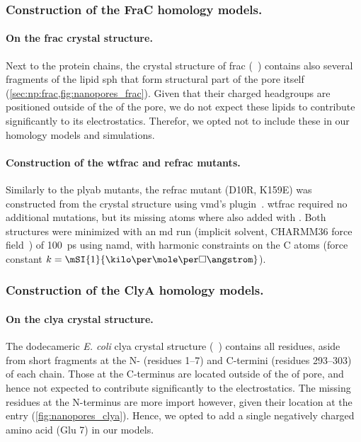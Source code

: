\subsubsection{Construction of the FraC homology models.}
%

\paragraph{On the \gls{frac} crystal structure.}
%
Next to the protein chains, the crystal structure of \gls{frac} (~\cite{Tanaka-2015}) contains
also several fragments of the lipid \gls{sph} that form structural part of the pore itself
(\cref{sec:np:frac,fig:nanopores_frac}). Given that their charged headgroups are positioned outside of the
\lumen{} of the pore, we do not expect these lipids to contribute significantly to its electrostatics.
Therefor, we opted not to include these in our homology models and simulations.

\paragraph{Construction of the \gls{wtfrac} and \gls{refrac} mutants.}
%
Similarly to the \gls{plyab} mutants, the \gls{refrac} mutant (D10R, K159E) was constructed from the crystal
structure using \gls{vmd}'s  plugin~\cite{Humphrey-1996}. \Gls{wtfrac} required no additional
mutations, but its missing atoms where also added with . Both structures were minimized with an
\gls{md} run (implicit solvent, CHARMM36 force field~\cite{Best-2012}) of \SI{100}{\ps} using \gls{namd}, with
harmonic constraints on the C\ta{} atoms (force constant $k =
\mSI{1}{\kilo\cal\per\mole\per\square\angstrom}$).


\subsubsection{Construction of the ClyA homology models.}
%

\paragraph{On the \gls{clya} crystal structure.}
%
The dodecameric \textit{E. coli} \gls{clya} crystal structure (~\cite{Mueller-2009}) contains all
residues, aside from short fragments at the N- (residues \numrange{1}{7}) and C-termini (residues
\numrange{293}{303}) of each chain. Those at the C-terminus are located outside of the \lumen{} of pore, and
hence not expected to contribute significantly to the electrostatics. The missing residues at the N-terminus
are more import however, given their location at the \transi{} entry (\cref{fig:nanopores_clya}). Hence, we
opted to add a single negatively charged amino acid (Glu 7) in our models.

